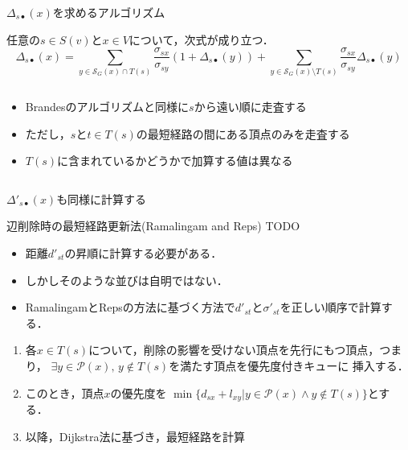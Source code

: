 \documentclass[dvipdfmx,fleqn]{beamer}
\begin{document}
\begin{frame}{$\Delta_{s\bullet}(x)$を求めるアルゴリズム}
  
  \begin{theorem}\small
    任意の$s\in S(v)$と$x\in V$について，次式が成り立つ．
    \begin{equation*}
      \Delta_{s\bullet}(x)
      =\sum_{y\in\mathcal{S}_G(x)\cap T(s)}\frac{\sigma_{sx}}{\sigma_{sy}}(1+\Delta_{s\bullet}(y))
      +\sum_{y\in\mathcal{S}_G(x)\setminus T(s)}\frac{\sigma_{sx}}{\sigma_{sy}}\Delta_{s\bullet}(y)
    \end{equation*}
  \end{theorem}
  \begin{columns}
    \begin{column}{.49\textwidth}
      \begin{itemize}
      \item Brandesのアルゴリズムと同様に$s$から遠い順に走査する
      \item ただし，$s$と$t\in T(s)$の最短経路の間にある頂点のみを走査する
      \item $T(s)$に含まれているかどうかで加算する値は異なる
      \end{itemize}
    \end{column}
    \begin{column}{.49\textwidth}
      \centering
      \def\svgwidth{.9\columnwidth}
      
    \end{column}
  \end{columns}
  $\Delta'_{s\bullet}(x)$も同様に計算する
\end{frame}

\begin{frame}{辺削除時の最短経路更新法(Ramalingam and Reps)}
  \alert{TODO}
  \begin{itemize}
  \item 距離$d'_{st}$の昇順に計算する必要がある．
  \item[] しかしそのような並びは自明ではない．
  \item RamalingamとRepsの方法に基づく方法で$d'_{st}$と$\sigma'_{st}$を正しい順序で計算する．
  \end{itemize}

  \begin{enumerate}
  \item 各$x\in T(s)$について，削除の影響を受けない頂点を先行にもつ頂点，つまり，
  $\exists y\in\mathcal{P}(x),\,y\notin T(s)$を満たす頂点を優先度付きキューに
  挿入する．
  \item このとき，頂点$x$の優先度を
    $\min\{d_{sx}+l_{xy}|y\in\mathcal{P}(x)\land y\notin T(s)\}$とする．
  \item 以降，Dijkstra法に基づき，最短経路を計算
  \end{enumerate}
\end{frame}
\end{document}
